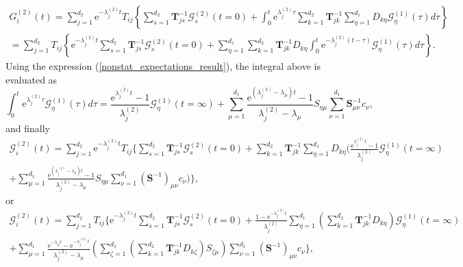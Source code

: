 \documentclass[a4paper, 11pt]{article}
\begin{document}
\begin{multline} \label{nonstationary_o2_solution}
  G^{(2)}_i(t) = \sum_{j=1}^{d_2}\mathrm e^{-\lambda^{(2)}_jt}T_{ij}\left\{\sum_{s=1}^{d_2}\mathbf T^{-1}_{js}\mathcal G^{(2)}_s(t=0) + \int_0^t\mathrm e^{\lambda^{(2)}_j\tau}\sum_{k=1}^{d_2}\mathbf T^{-1}_{jk}\sum_{\eta=1}^{d_1}D_{k\eta}\mathcal G^{(1)}_\eta(\tau)d\tau\right\}\\
  = \sum_{j=1}^{d_2}T_{ij}\left\{\mathrm e^{-\lambda^{(2)}_jt}\sum_{s=1}^{d_2}\mathbf T^{-1}_{js}\mathcal G^{(2)}_s(t=0) + \sum_{\eta=1}^{d_1}\sum_{k=1}^{d_2}\mathbf T^{-1}_{jk}D_{k\eta}\int_0^t\mathrm e^{-\lambda^{(2)}_j(t-\tau)}\mathcal G^{(1)}_\eta(\tau)d\tau\right\}.
\end{multline}
Using the expression (\ref{nonstat_expectations_result}), the integral above is evaluated as
\begin{equation}
  \int_0^t\mathrm e^{\lambda_j^{(2)}\tau}\mathcal G^{(1)}_\eta(\tau)d\tau = \frac{\mathrm e^{\lambda_j^{(2)}t} - 1}{\lambda^{(2)}_j}\mathcal G_\eta^{(1)}(t=\infty) + \sum_{\mu=1}^{d_1}\frac{\mathrm e^{(\lambda^{(2)}_j-\lambda_\mu)t}-1}{\lambda^{(2)}_j-\lambda_\mu}S_{\eta\mu}\sum_{\nu=1}^{d_1}\mathbf S^{-1}_{\mu\nu}c_\nu,
\end{equation}
and finally
\begin{multline}
  \mathcal G^{(2)}_i(t) =  \sum_{j=1}^{d_2}\mathrm e^{-\lambda^{(2)}_jt}T_{ij}\Bigg\{\sum_{s=1}^{d_2}\mathbf T^{-1}_{js}\mathcal G^{(2)}_s(t=0) + \sum_{k=1}^{d_2}\mathbf T^{-1}_{jk}\sum_{\eta=1}^{d_1}D_{k\eta}\Bigg(\frac{\mathrm e^{\lambda_j^{(2)}t} - 1}{\lambda^{(2)}_j}\mathcal G_\eta^{(1)}(t=\infty)\\
  + \sum_{\mu=1}^{d_1}\frac{\mathrm e^{(\lambda^{(2)}_j-\lambda_\mu)t}-1}{\lambda^{(2)}_j-\lambda_\mu}S_{\eta\mu}\sum_{\nu=1}^{d_1}(\mathbf S^{-1})_{\mu\nu}c_\nu\Bigg)\Bigg\},
\end{multline}
or
\begin{multline} \label{nonstat_covar}
  \mathcal G^{(2)}_i(t) =  \sum_{j=1}^{d_2}T_{ij}\Bigg\{\mathrm e^{-\lambda^{(2)}_jt}\sum_{s=1}^{d_2}\mathbf T^{-1}_{js}\mathcal G^{(2)}_s(t=0) + \frac{1 - \mathrm e^{-\lambda^{(2)}_jt}}{\lambda^{(2)}_j}\sum_{\eta=1}^{d_1}\left(\sum_{k=1}^{d_2}\mathbf T^{-1}_{jk}D_{k\eta}\right)\mathcal G_\eta^{(1)}(t=\infty)\\
  + \sum_{\mu=1}^{d_1}\frac{\mathrm e^{-\lambda_\mu t}-\mathrm e^{-\lambda^{(2)}_jt}}{\lambda^{(2)}_j-\lambda_\mu}\left(\sum_{\zeta=1}^{d_1}\left(\sum_{k=1}^{d_2}\mathbf T^{-1}_{jk}D_{k\zeta}\right)S_{\zeta\mu}\right)\sum_{\nu=1}^{d_1}(\mathbf S^{-1})_{\mu\nu}c_\nu\Bigg\},
\end{multline}
\end{document}
